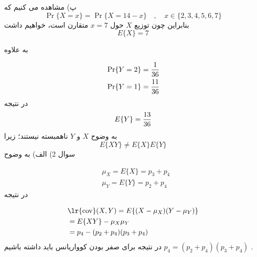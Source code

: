 \documentclass[10pt,letterpaper]{report}
\newcommand{\eqn}[1]{
\[\begin{split}
#1
\end{split}\]
}
\begin{document}
پ) مشاهده می کنیم که 
$$
\Pr\{X=x\}=\Pr\{X=14-x\}\quad,\quad x\in\{2,3,4,5,6,7\}
$$
بنابراین چون توزیع $X$ حول $x=7$ متقارن است، خواهیم داشت 
$$
E\{X\}=7
$$

به علاوه
\eqn{
&\Pr\{Y=2\}={1\over 36}
\\&\Pr\{Y=1\}={11\over 36}
}{}
در نتیجه
$$
E\{Y\}={13\over 36}
$$
به وضوح $X$ و $Y$ ناهمبسته نیستند؛ زیرا 
$$
E\{XY\}\ne E\{X\}E\{Y\}
$$
\newline\newline
سوال 2) الف) به وضوح 
\eqn{
&\mu_X=E\{X\}=p_3+p_4
\\&\mu_Y=E\{Y\}=p_2+p_4
}{}
در نتیجه
\eqn{
&\text{\lr{cov}}(X,Y)=E\{(X-\mu_X)(Y-\mu_Y)\}
\\&=E\{XY\}-\mu_X\mu_Y
\\&=p_4-(p_2+p_4)(p_3+p_4)
}{}
در نتیجه برای صفر بودن کوواریانس باید داشته باشیم 
$
p_4=(p_2+p_4)(p_3+p_4)
$
.
\end{document}
